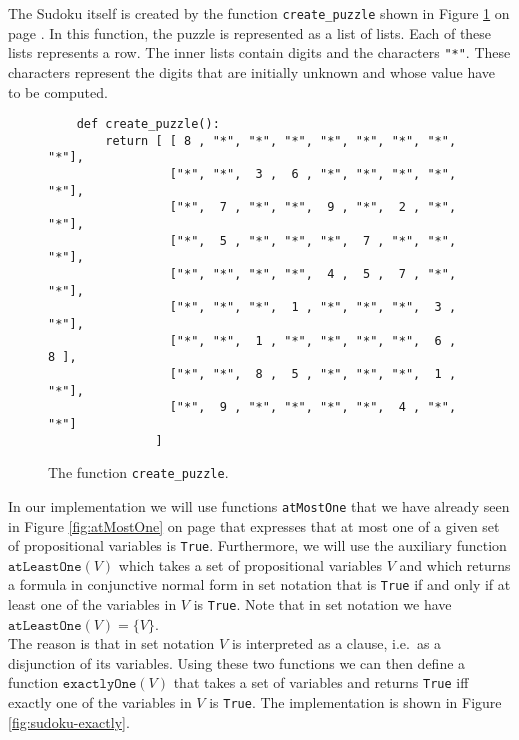 The Sudoku itself is created by the function \texttt{create\_puzzle} shown in Figure
\ref{fig:sudoku-create-puzzle} on page \pageref{fig:sudoku-create-puzzle}.  In this function, the puzzle is
represented as a list of lists.  Each of these lists represents a row.  The inner lists contain digits and the
characters \texttt{"*"}.  These characters represent the digits that are initially unknown and whose value have
to be computed.

\begin{figure}[!ht]
\centering
\begin{verbatim}
    def create_puzzle():
        return [ [ 8 , "*", "*", "*", "*", "*", "*", "*", "*"], 
                 ["*", "*",  3 ,  6 , "*", "*", "*", "*", "*"],
                 ["*",  7 , "*", "*",  9 , "*",  2 , "*", "*"],
                 ["*",  5 , "*", "*", "*",  7 , "*", "*", "*"],
                 ["*", "*", "*", "*",  4 ,  5 ,  7 , "*", "*"],
                 ["*", "*", "*",  1 , "*", "*", "*",  3 , "*"],
                 ["*", "*",  1 , "*", "*", "*", "*",  6 ,  8 ],
                 ["*", "*",  8 ,  5 , "*", "*", "*",  1 , "*"],
                 ["*",  9 , "*", "*", "*", "*",  4 , "*", "*"]
               ]
\end{verbatim}
\vspace*{-0.3cm}
\caption{The function \texttt{create\_puzzle}.}
\label{fig:sudoku-create-puzzle}
\end{figure}

In our implementation we will use functions \texttt{atMostOne} that we have already seen in Figure
\ref{fig:atMostOne} on page \pageref{fig:atMostOne} that expresses that at most one of a given set of
propositional variables is \texttt{True}.  Furthermore, we will use the auxiliary function
$\texttt{atLeastOne}(V)$ which takes a set of propositional variables $V$ and which returns a formula in
conjunctive normal form in set notation that is \texttt{True} if and only if at least one of the variables in
$V$ is \texttt{True}.  Note that in set notation we have
\\[0.2cm]
\hspace*{1.3cm}
$\texttt{atLeastOne}(V) = \bigl\{ V \bigr\}$.
\\[0.2cm]
The reason is that in set notation  $V$ is interpreted as a clause, i.e.~as a disjunction of its variables.
Using these two functions we can then define a function $\texttt{exactlyOne}(V)$ that
takes a set of variables and returns \texttt{True} iff exactly one of the variables in $V$ is \texttt{True}.
The implementation is shown in Figure \ref{fig:sudoku-exactly}.

